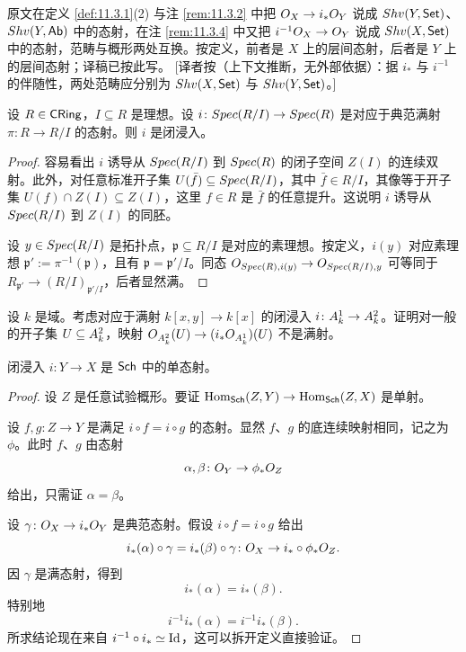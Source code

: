 \begin{yizhu}
原文在定义 \ref{def:11.3.1}(2) 与注 \ref{rem:11.3.2} 中把 $O_X \to i_*O_Y$ 说成 $Shv(Y,\mathsf{Set})$、$Shv(Y,\mathsf{Ab})$ 中的态射，在注 \ref{rem:11.3.4} 中又把 $i^{-1}O_X \to O_Y$ 说成 $Shv(X,\mathsf{Set})$ 中的态射，范畴与概形两处互换。按定义，前者是 $X$ 上的层间态射，后者是 $Y$ 上的层间态射；译稿已按此写。
[译者按（上下文推断，无外部依据）：据 $i_*$ 与 $i^{-1}$ 的伴随性，两处范畴应分别为 $Shv(X,\mathsf{Set})$ 与 $Shv(Y,\mathsf{Set})$。]
\end{yizhu}

\begin{proposition}\label{prop:11.3.5}
设 $R \in \mathsf{CRing}$，$I \subseteq R$ 是理想。设 $i \colon Spec(R/I) \to Spec(R)$ 是对应于典范满射 $\pi \colon R \to R/I$ 的态射。则 $i$ 是闭浸入。
\end{proposition}

\begin{proof}
容易看出 $i$ 诱导从 $Spec(R/I)$ 到 $Spec(R)$ 的闭子空间 $Z(I)$ 的连续双射。此外，对任意标准开子集 $U(\bar f) \subseteq Spec(R/I)$，其中 $\bar f \in R/I$，其像等于开子集 $U(f) \cap Z(I) \subseteq Z(I)$，这里 $f \in R$ 是 $\bar f$ 的任意提升。这说明 $i$ 诱导从 $Spec(R/I)$ 到 $Z(I)$ 的同胚。

设 $y \in Spec(R/I)$ 是拓扑点，$\mathfrak p \subseteq R/I$ 是对应的素理想。按定义，$i(y)$ 对应素理想 $\mathfrak p' := \pi^{-1}(\mathfrak p)$，且有 $\mathfrak p = \mathfrak p'/I$。同态 $O_{Spec(R),i(y)} \to O_{Spec(R/I),y}$ 可等同于 $R_{\mathfrak p'} \to (R/I)_{\mathfrak p'/I}$，后者显然满。
\end{proof}

\begin{exercise}\label{exc:11.3.6}
设 $k$ 是域。考虑对应于满射 $k[x,y] \to k[x]$ 的闭浸入 $i \colon A^1_k \to A^2_k$。证明对一般的开子集 $U \subseteq A^2_k$，映射 $O_{A^2_k}(U) \to (i_*O_{A^1_k})(U)$ 不是满射。
\end{exercise}

\begin{proposition}\label{prop:11.3.7}
闭浸入 $i \colon Y \to X$ 是 $\mathsf{Sch}$ 中的单态射。
\end{proposition}

\begin{proof}
设 $Z$ 是任意试验概形。要证 $\operatorname{Hom}_{\mathsf{Sch}}(Z,Y) \to \operatorname{Hom}_{\mathsf{Sch}}(Z,X)$ 是单射。

设 $f, g \colon Z \to Y$ 是满足 $i \circ f = i \circ g$ 的态射。显然 $f$、$g$ 的底连续映射相同，记之为 $\phi$。此时 $f$、$g$ 由态射
\[
\alpha, \beta \colon O_Y \to \phi_*O_Z
\]
给出，只需证 $\alpha = \beta$。

设 $\gamma \colon O_X \to i_*O_Y$ 是典范态射。假设 $i \circ f = i \circ g$ 给出
\[
i_*(\alpha) \circ \gamma = i_*(\beta) \circ \gamma \colon O_X \to i_* \circ \phi_*O_Z .
\]
因 $\gamma$ 是满态射，得到
\[
i_*(\alpha) = i_*(\beta).
\]
特别地
\[
i^{-1} i_*(\alpha) = i^{-1} i_*(\beta).
\]
所求结论现在来自 $i^{-1} \circ i_* \simeq \mathrm{Id}$，这可以拆开定义直接验证。
\end{proof}

